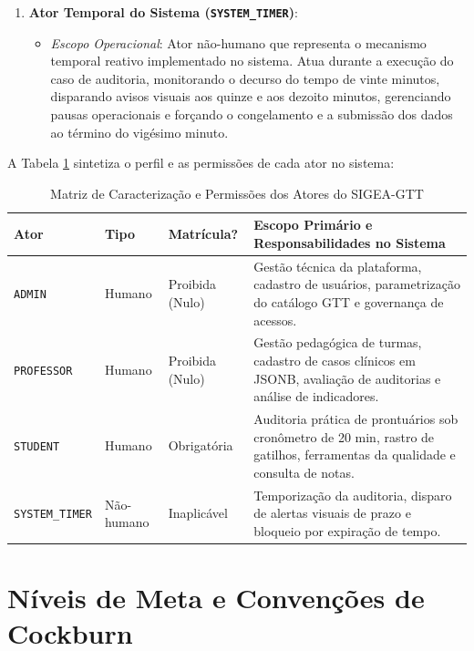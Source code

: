 \begin{enumerate}
    \item \textbf{Ator Temporal do Sistema (\texttt{SYSTEM\_TIMER})}:
    \begin{itemize}
        \item \textit{Escopo Operacional}: Ator não-humano que representa o mecanismo temporal reativo implementado no sistema. Atua durante a execução do caso de auditoria, monitorando o decurso do tempo de vinte minutos, disparando avisos visuais aos quinze e aos dezoito minutos, gerenciando pausas operacionais e forçando o congelamento e a submissão dos dados ao término do vigésimo minuto.
    \end{itemize}
\end{enumerate}

A Tabela \ref{tab_caracterizacao_atores} sintetiza o perfil e as permissões de cada ator no sistema:

\begin{table}[!ht]
\centering
\caption{Matriz de Caracterização e Permissões dos Atores do SIGEA-GTT}
\label{tab_caracterizacao_atores}
\footnotesize
\begin{tabularx}{\textwidth}{p{2.8cm} p{1.8cm} p{2.2cm} X}
\toprule
\textbf{Ator} & \textbf{Tipo} & \textbf{Matrícula?} & \textbf{Escopo Primário e Responsabilidades no Sistema} \\
\midrule
\texttt{ADMIN} & Humano & Proibida (Nulo) & Gestão técnica da plataforma, cadastro de usuários, parametrização do catálogo GTT e governança de acessos. \\
\texttt{PROFESSOR} & Humano & Proibida (Nulo) & Gestão pedagógica de turmas, cadastro de casos clínicos em JSONB, avaliação de auditorias e análise de indicadores. \\
\texttt{STUDENT} & Humano & Obrigatória & Auditoria prática de prontuários sob cronômetro de 20 min, rastro de gatilhos, ferramentas da qualidade e consulta de notas. \\
\texttt{SYSTEM\_TIMER} & Não-humano & Inaplicável & Temporização da auditoria, disparo de alertas visuais de prazo e bloqueio por expiração de tempo. \\
\bottomrule
\end{tabularx}
\end{table}

\section{Níveis de Meta e Convenções de Cockburn}
\label{sec_niveis_meta}


